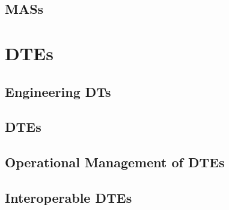 \documentclass[12pt,a4paper,openright,twoside]{book}
\begin{document}



\chapter{\aclp{MAS}}
\label{chap:back:MAS}



\part{\aclp{DTE}}

\chapter{Engineering \aclp{DT}}
\label{chap:dte:egineering-dt}



\chapter{\aclp{DTE}}
\label{chap:dte:dte}



\chapter{Operational Management of \aclp{DTE}}
\label{chap:dte:dtc}




\chapter{Interoperable \aclp{DTE}}
\label{chap:dte:hwodt}
\end{document}
